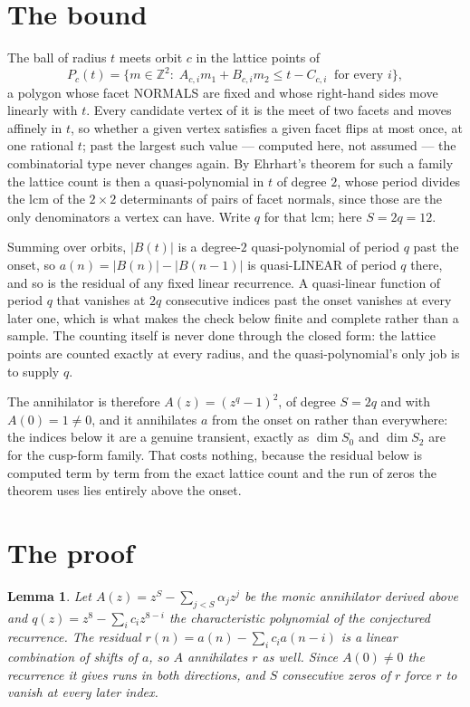 \documentclass[11pt,a4paper]{article}
\theoremstyle{plain}
\newtheorem{lemma}[theorem]{Lemma}
\theoremstyle{definition}
\begin{document}
\section{The bound}

The ball of radius $t$ meets orbit $c$ in the lattice points of
\[
P_c(t)=\{m\in\mathbb{Z}^2:\;A_{c,i}m_1+B_{c,i}m_2\le t-C_{c,i}\ \text{ for every } i\},
\]
a polygon whose facet NORMALS are fixed and whose right-hand sides move linearly with $t$.
Every candidate vertex of it is the meet of two facets and moves affinely in $t$, so whether a
given vertex satisfies a given facet flips at most once, at one rational $t$; past the largest
such value --- computed here, not assumed --- the combinatorial type never changes again. By
Ehrhart's theorem for such a family the lattice count is then a quasi-polynomial in $t$ of
degree $2$, whose period divides the lcm of the $2\times2$ determinants of pairs of facet
normals, since those are the only denominators a vertex can have. Write $q$ for that lcm;
here $S=2q=12$.

Summing over orbits, $|B(t)|$ is a degree-$2$ quasi-polynomial of period $q$ past the onset,
so $a(n)=|B(n)|-|B(n-1)|$ is quasi-LINEAR of period $q$ there, and so is the residual of any
fixed linear recurrence. A quasi-linear function of period $q$ that vanishes at $2q$
consecutive indices past the onset vanishes at every later one, which is what makes the check
below finite and complete rather than a sample. The counting itself is never done through the
closed form: the lattice points are counted exactly at every radius, and the quasi-polynomial's
only job is to supply $q$.

The annihilator is therefore $A(z)=(z^{q}-1)^2$, of degree $S=2q$ and with $A(0)=1\ne0$, and
it annihilates $a$ from the onset on rather than everywhere: the indices below it are a
genuine transient, exactly as $\dim S_0$ and $\dim S_2$ are for the cusp-form family. That
costs nothing, because the residual below is computed term by term from the exact lattice
count and the run of zeros the theorem uses lies entirely above the onset.

\section{The proof}

\begin{lemma}\label{lem:crit}
Let $A(z)=z^S-\sum_{j<S}\alpha_jz^{j}$ be the monic annihilator derived above and
$q(z)=z^{8}-\sum_ic_iz^{8-i}$ the characteristic polynomial of the conjectured
recurrence. The residual $r(n)=a(n)-\sum_ic_ia(n-i)$ is a linear combination of shifts of $a$,
so $A$ annihilates $r$ as well. Since $A(0)\ne0$ the recurrence it gives runs in both
directions, and $S$ consecutive zeros of $r$ force $r$ to vanish at every later index.
\end{lemma}
\end{document}
